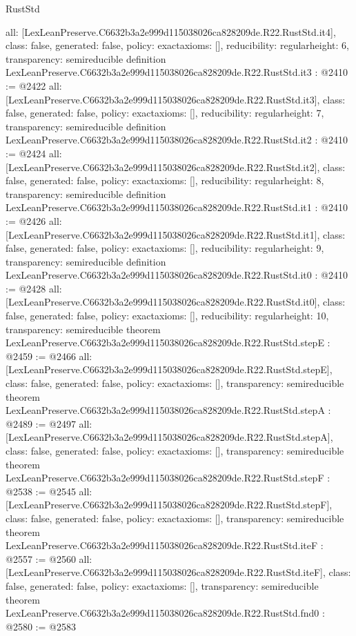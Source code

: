 \begin{lexlean}{RustStd}
\begin{coremodule}
{  all: [LexLeanPreserve.C6632b3a2e999d115038026ca828209de.R22.RustStd.it4],
  class: false,
  generated: false,
  policy: exact{axioms: []},
  reducibility: regular{height: 6},
  transparency: semireducible
}
definition LexLeanPreserve.C6632b3a2e999d115038026ca828209de.R22.RustStd.it3 : @2410 := @2422 {
  all: [LexLeanPreserve.C6632b3a2e999d115038026ca828209de.R22.RustStd.it3],
  class: false,
  generated: false,
  policy: exact{axioms: []},
  reducibility: regular{height: 7},
  transparency: semireducible
}
definition LexLeanPreserve.C6632b3a2e999d115038026ca828209de.R22.RustStd.it2 : @2410 := @2424 {
  all: [LexLeanPreserve.C6632b3a2e999d115038026ca828209de.R22.RustStd.it2],
  class: false,
  generated: false,
  policy: exact{axioms: []},
  reducibility: regular{height: 8},
  transparency: semireducible
}
definition LexLeanPreserve.C6632b3a2e999d115038026ca828209de.R22.RustStd.it1 : @2410 := @2426 {
  all: [LexLeanPreserve.C6632b3a2e999d115038026ca828209de.R22.RustStd.it1],
  class: false,
  generated: false,
  policy: exact{axioms: []},
  reducibility: regular{height: 9},
  transparency: semireducible
}
definition LexLeanPreserve.C6632b3a2e999d115038026ca828209de.R22.RustStd.it0 : @2410 := @2428 {
  all: [LexLeanPreserve.C6632b3a2e999d115038026ca828209de.R22.RustStd.it0],
  class: false,
  generated: false,
  policy: exact{axioms: []},
  reducibility: regular{height: 10},
  transparency: semireducible
}
theorem LexLeanPreserve.C6632b3a2e999d115038026ca828209de.R22.RustStd.stepE : @2459 := @2466 {
  all: [LexLeanPreserve.C6632b3a2e999d115038026ca828209de.R22.RustStd.stepE],
  class: false,
  generated: false,
  policy: exact{axioms: []},
  transparency: semireducible
}
theorem LexLeanPreserve.C6632b3a2e999d115038026ca828209de.R22.RustStd.stepA : @2489 := @2497 {
  all: [LexLeanPreserve.C6632b3a2e999d115038026ca828209de.R22.RustStd.stepA],
  class: false,
  generated: false,
  policy: exact{axioms: []},
  transparency: semireducible
}
theorem LexLeanPreserve.C6632b3a2e999d115038026ca828209de.R22.RustStd.stepF : @2538 := @2545 {
  all: [LexLeanPreserve.C6632b3a2e999d115038026ca828209de.R22.RustStd.stepF],
  class: false,
  generated: false,
  policy: exact{axioms: []},
  transparency: semireducible
}
theorem LexLeanPreserve.C6632b3a2e999d115038026ca828209de.R22.RustStd.iteF : @2557 := @2560 {
  all: [LexLeanPreserve.C6632b3a2e999d115038026ca828209de.R22.RustStd.iteF],
  class: false,
  generated: false,
  policy: exact{axioms: []},
  transparency: semireducible
}
theorem LexLeanPreserve.C6632b3a2e999d115038026ca828209de.R22.RustStd.fnd0 : @2580 := @2583 {
}
\end{coremodule}
\end{lexlean}
